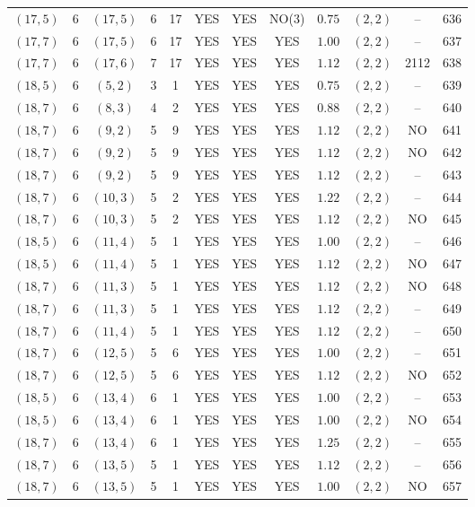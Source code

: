 \begin{longtable}{|c|c|c|c|c|c|c|c|c|c|c|c|}
$(17,5)$ & 6 & $(17,5)$ & 6 & 17 & YES & YES & NO(3) & $0.75$ & $(2,2)$ & -- & 636\\
$(17,7)$ & 6 & $(17,5)$ & 6 & 17 & YES & YES & YES & $1.00$ & $(2,2)$ & -- & 637\\
$(17,7)$ & 6 & $(17,6)$ & 7 & 17 & YES & YES & YES & $1.12$ & $(2,2)$ & 2112 & 638\\
$(18,5)$ & 6 & $(5,2)$ & 3 & 1 & YES & YES & YES & $0.75$ & $(2,2)$ & -- & 639\\
$(18,7)$ & 6 & $(8,3)$ & 4 & 2 & YES & YES & YES & $0.88$ & $(2,2)$ & -- & 640\\
$(18,7)$ & 6 & $(9,2)$ & 5 & 9 & YES & YES & YES & $1.12$ & $(2,2)$ & NO & 641\\
$(18,7)$ & 6 & $(9,2)$ & 5 & 9 & YES & YES & YES & $1.12$ & $(2,2)$ & NO & 642\\
$(18,7)$ & 6 & $(9,2)$ & 5 & 9 & YES & YES & YES & $1.12$ & $(2,2)$ & -- & 643\\
$(18,7)$ & 6 & $(10,3)$ & 5 & 2 & YES & YES & YES & $1.22$ & $(2,2)$ & -- & 644\\
$(18,7)$ & 6 & $(10,3)$ & 5 & 2 & YES & YES & YES & $1.12$ & $(2,2)$ & NO & 645\\
$(18,5)$ & 6 & $(11,4)$ & 5 & 1 & YES & YES & YES & $1.00$ & $(2,2)$ & -- & 646\\
$(18,5)$ & 6 & $(11,4)$ & 5 & 1 & YES & YES & YES & $1.12$ & $(2,2)$ & NO & 647\\
$(18,7)$ & 6 & $(11,3)$ & 5 & 1 & YES & YES & YES & $1.12$ & $(2,2)$ & NO & 648\\
$(18,7)$ & 6 & $(11,3)$ & 5 & 1 & YES & YES & YES & $1.12$ & $(2,2)$ & -- & 649\\
$(18,7)$ & 6 & $(11,4)$ & 5 & 1 & YES & YES & YES & $1.12$ & $(2,2)$ & -- & 650\\
$(18,7)$ & 6 & $(12,5)$ & 5 & 6 & YES & YES & YES & $1.00$ & $(2,2)$ & -- & 651\\
$(18,7)$ & 6 & $(12,5)$ & 5 & 6 & YES & YES & YES & $1.12$ & $(2,2)$ & NO & 652\\
$(18,5)$ & 6 & $(13,4)$ & 6 & 1 & YES & YES & YES & $1.00$ & $(2,2)$ & -- & 653\\
$(18,5)$ & 6 & $(13,4)$ & 6 & 1 & YES & YES & YES & $1.00$ & $(2,2)$ & NO & 654\\
$(18,7)$ & 6 & $(13,4)$ & 6 & 1 & YES & YES & YES & $1.25$ & $(2,2)$ & -- & 655\\
$(18,7)$ & 6 & $(13,5)$ & 5 & 1 & YES & YES & YES & $1.12$ & $(2,2)$ & -- & 656\\
$(18,7)$ & 6 & $(13,5)$ & 5 & 1 & YES & YES & YES & $1.00$ & $(2,2)$ & NO & 657\\

\end{longtable}
